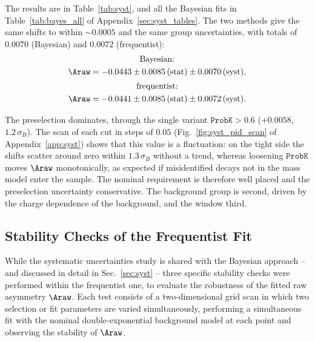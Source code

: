The results are in Table~\ref{tab:syst}, and all the Bayesian fits in Table~\ref{tab:bayes_all} of Appendix~\ref{sec:syst_tables}. The two methods give the same shifts to within $\sim$$0.0005$ and the same group uncertainties, with totals of $0.0070$ (Bayesian) and $0.0072$ (frequentist):
\begin{gather*}
\text{Bayesian:}\\ \Araw=-0.0443\pm0.0085\,(\text{stat})\pm0.0070\,(\text{syst}),\\[2pt]
\text{frequentist:}\\ \Araw=-0.0441\pm0.0085\,(\text{stat})\pm0.0072\,(\text{syst}).
\end{gather*}

The preselection dominates, through the single variant $\texttt{ProbK}>0.6$ ($+0.0058$, $1.2\,\sigma_B$). The scan of each cut in steps of $0.05$ (Fig.~\ref{fig:syst_pid_scan} of Appendix~\ref{app:syst}) shows that this value is a fluctuation: on the tight side the shifts scatter around zero within $1.3\,\sigma_B$ without a trend, whereas loosening $\texttt{ProbK}$ moves $\Araw$ monotonically, as expected if misidentified decays not in the mass model enter the sample. The nominal requirement is therefore well placed and the preselection uncertainty conservative. The background group is second, driven by the charge dependence of the background, and the window third.

\subsection{Stability Checks of the Frequentist Fit}
\label{sec:freq_syst}
While the systematic uncertainties study is shared with the Bayesian approach -- and discussed in detail in Sec.~\ref{sec:syst} -- three specific stability checks were performed within the frequentist one, to evaluate the robustness of the fitted raw asymmetry $\Araw$. Each test consists of a two-dimensional grid scan in which two selection or fit parameters are varied simultaneously, performing a simultaneous fit with the nominal double-exponential background model at each point and observing the stability of $\Araw$.


